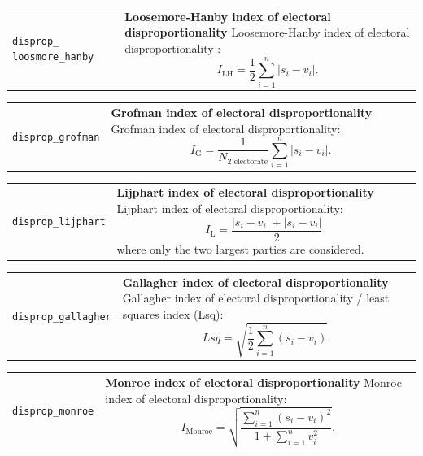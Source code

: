 \documentclass[
]{scrartcl}
\begin{document}
\begin{longtable}{p{3.2cm}| p{11cm}}
\texttt{disprop\_
loosmore\_hanby} &\textbf{Loosemore-Hanby index of electoral disproportionality}\newline 
Loosemore-Hanby index of electoral disproportionality \parencite{loosemoreTheoreticalLimitsMaximum1971}:
           \begin{equation}I_{\text{LH}} = \frac{1}{2}\sum_{i = 1}^{n}|s_i - v_i|.\end{equation}
\end{longtable}

\begin{longtable}{p{3.2cm}| p{11cm}}
\texttt{disprop\_grofman} &\textbf{Grofman index of electoral disproportionality}\newline 
Grofman index of electoral disproportionality:
           \begin{equation}I_{\text{G}} = \frac{1}{N_{2\text{ electorate}}}\sum_{i=1}^{n}|s_i - v_i|.\end{equation}
\end{longtable}

\begin{longtable}{p{3.2cm}| p{11cm}}
\texttt{disprop\_lijphart} &\textbf{Lijphart index of electoral disproportionality}\newline 
Lijphart index of electoral disproportionality:
           \begin{equation}I_{\text{L}} = \frac{|s_i - v_i| + |s_i - v_i|}{2}\end{equation}
           where only the two largest parties are considered.
\end{longtable}

\begin{longtable}{p{3.2cm}| p{11cm}}
\texttt{disprop\_gallagher} &\textbf{Gallagher index of electoral disproportionality}\newline 
Gallagher index of electoral disproportionality / least squares index (Lsq):
          \begin{equation}Lsq = \sqrt{\frac{1}{2}\sum_{i = 1}^{n}\left(s_i - v_i\right)}.\end{equation}
\end{longtable}

\begin{longtable}{p{3.2cm}| p{11cm}}
\texttt{disprop\_monroe} &\textbf{Monroe index of electoral disproportionality}\newline 
Monroe index of electoral disproportionality:
           \begin{equation}I_{\text{Monroe}} = \sqrt{\frac{\sum_{i=1}^{n}\left(s_i - v_i\right)^2}{1 + \sum_{i=1}^{n}v_i^2}}.\end{equation}
\end{longtable}
\end{document}
